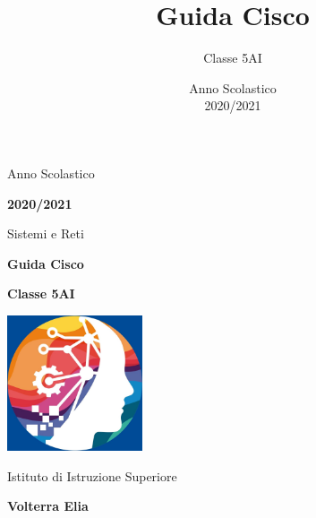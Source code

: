 \documentclass[titlepage]{article}
\title{Guida Cisco}
\author{Classe 5AI}
\date{Anno Scolastico\\ 2020/2021}
\begin{document}
\begin{titlepage}
    \centering

    \vspace*{1cm}

    {\large Anno Scolastico}
    
    \vspace{5px}

    \textbf{\Large 2020/2021}

    \vspace{5cm}

    {\large Sistemi e Reti}

    \vspace{0.5cm}

    \textbf{\huge Guida Cisco}

    \vspace{0.5cm}

    \textbf{\Large Classe 5AI}

    \vspace{1.5cm}

    \vfill

    \includegraphics[width=0.3\textwidth]{images/logo.jpg}

    \vspace{10px}

    {\large Istituto di Istruzione Superiore}

    \vspace{5px}

    \textbf{\LARGE Volterra Elia}
\end{titlepage}

\tableofcontents
\newpage









\end{document}
